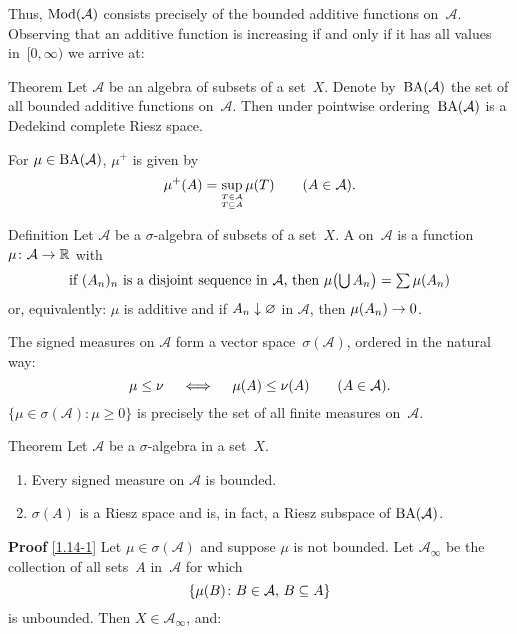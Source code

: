 \documentclass[main.tex]{subfiles}
\begin{document}
Thus, $\mathrm{Mod}(\mathcal A)$ consists precisely of
the bounded additive functions on~$\mathcal A$.
Observing that an additive function is increasing
if and only if it has all values in~$[0,\infty)$
we arrive at:
\begin{psec}{Theorem}
\label{1.12}
Let $\mathcal A$ be an algebra of subsets
of a set~$X$.
Denote by~$\mathrm{BA}(\mathcal A)$ 
the set of all bounded additive functions on~$\mathcal A$.
Then under pointwise ordering~$\mathrm{BA}(\mathcal A)$
is a Dedekind complete Riesz space.
\end{psec}
For $\mu \in \mathrm{BA}(\mathcal A)$, $\mu^+$ is given by
\begin{equation*}
\mu^+(A) 
  = \sup_{\substack{\scriptscriptstyle T\in \mathcal{A} \\
		    \scriptscriptstyle T\subseteq A}} \mu(T)
  \qquad (A\in\mathcal A)
\textnormal{.}
\end{equation*}
%
%
\begin{psec}{Definition}
\label{1.13}
Let $\mathcal A$ be a $\sigma$-algebra 
of subsets of a set~$X$.
A  on~$\mathcal A$
is a function~$\mu\colon\mathcal A \rightarrow \mathbb{R}$ with
\begin{equation*}
\textstyle{\ensuremath{\textnormal{if }}(A_n)_n\ensuremath{\textnormal{ is a disjoint sequence in }}\mathcal{A}
\ensuremath{\textnormal{, then }}\mu\bigl(\bigcup A_n\bigr)=\sum\mu(A_n)}
\end{equation*}
or, equivalently: 
$\mu$ is additive
and if $A_n\downarrow \varnothing$ in $\mathcal A$,
then $\mu(A_n)\rightarrow 0$.

The signed measures on $\mathcal A$ form 
a vector space~$\sigma(\mathcal A)$,
ordered in the natural way:
\begin{equation*}
\mu \leq \nu 
  \quad \iff \quad
  \mu(A)\leq\nu(A)\qquad (A\in\mathcal A)
\textnormal{.}
\end{equation*}
$\{ \mu\in \sigma(\mathcal A)\colon \mu \ge 0\}$
is precisely the set of all finite measures on~$\mathcal A$.
\end{psec}
%
%
\begin{psec}{Theorem}
Let $\mathcal{A}$ be a $\sigma$-algebra in a set~$X$.
\begin{enumerate}
\item
\label{1.14-1}
Every signed measure on $\mathcal A$ is bounded.
%
\item
\label{1.14-2}
$\sigma(A)$ is a Riesz space and is, 
in fact,
a Riesz subspace of $\mathrm{BA}(\mathcal A)$.
\end{enumerate}
\end{psec}
\textbf{Proof}
\ref{1.14-1} Let $\mu\in\sigma(\mathcal A)$
and suppose $\mu$ is not bounded.
Let $\mathcal{A}_\infty$ be
the collection of all sets~$A$ in~$\mathcal A$ for which
\begin{equation*}
\{ \mu(B)\colon B\in \mathcal A\textnormal{, }B\subseteq A \}
\end{equation*} 
is unbounded.  
Then $X\in\mathcal{A}_\infty$, and:
\end{document}
